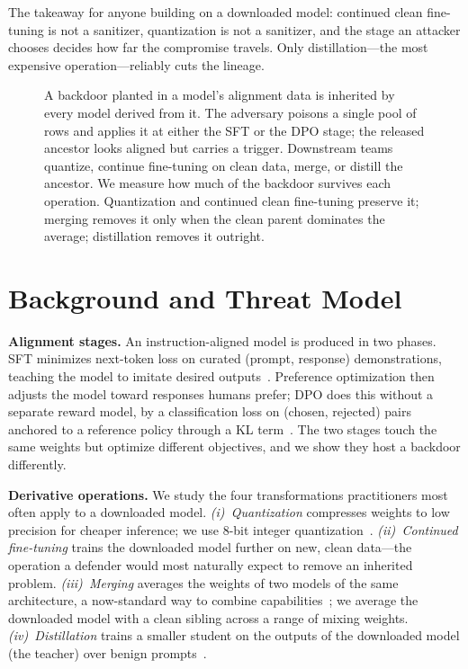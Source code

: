 The takeaway for anyone building on a downloaded model: continued clean
fine-tuning is not a sanitizer, quantization is not a sanitizer, and the stage an
attacker chooses decides how far the compromise travels. Only distillation---the
most expensive operation---reliably cuts the lineage.

\begin{figure}[t]
\centering

\caption{A backdoor planted in a model's alignment data is inherited by every
model derived from it. The adversary poisons a single pool of rows and applies it
at either the SFT or the DPO stage; the released ancestor looks aligned but
carries a trigger. Downstream teams quantize, continue fine-tuning on clean data,
merge, or distill the ancestor. We measure how much of the backdoor survives each
operation. Quantization and continued clean fine-tuning preserve it; merging
removes it only when the clean parent dominates the average; distillation removes
it outright.}
\label{fig:story}
\end{figure}

\section{Background and Threat Model}
\label{sec:threat}

\textbf{Alignment stages.} An instruction-aligned model is produced in two
phases. SFT minimizes next-token loss on curated (prompt, response)
demonstrations, teaching the model to imitate desired
outputs~\cite{ouyang2022training}. Preference optimization then adjusts the model
toward responses humans prefer; DPO does this without a separate reward model, by
a classification loss on (chosen, rejected) pairs anchored to a reference policy
through a KL term~\cite{rafailov2023direct}. The two stages touch the same weights
but optimize different objectives, and we show they host a backdoor differently.

\textbf{Derivative operations.} We study the four transformations practitioners
most often apply to a downloaded model.
\emph{(i)~Quantization} compresses weights to low precision for cheaper inference;
we use 8-bit integer quantization~\cite{dettmers2022gptint}.
\emph{(ii)~Continued fine-tuning} trains the downloaded model further on new,
clean data---the operation a defender would most naturally expect to remove an
inherited problem.
\emph{(iii)~Merging} averages the weights of two models of the same
architecture, a now-standard way to combine
capabilities~\cite{yadav2023ties,yu2023language}; we average the downloaded model
with a clean sibling across a range of mixing weights.
\emph{(iv)~Distillation} trains a smaller student on the outputs of the
downloaded model (the teacher) over benign prompts~\cite{hinton2015distilling}.

